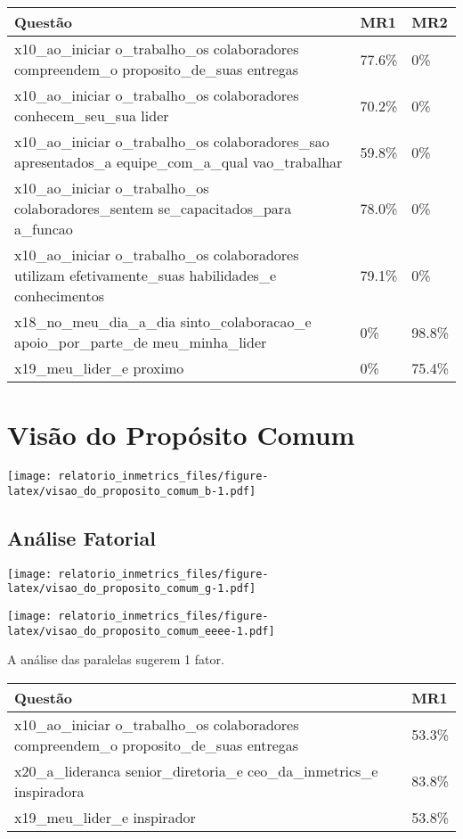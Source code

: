 \documentclass[]{book}
\begin{document}
\begin{table}[H]
\centering\begingroup\fontsize{12}{14}\selectfont

\begin{tabular}{>{\raggedright\arraybackslash}p{20em}ll}
\toprule
Questão & MR1 & MR2\\
\midrule
x10\_ao\_iniciar
o\_trabalho\_os
colaboradores
compreendem\_o
proposito\_de\_suas
entregas & 77.6\% & 0\%\\
x10\_ao\_iniciar
o\_trabalho\_os
colaboradores
conhecem\_seu\_sua
lider & 70.2\% & 0\%\\
x10\_ao\_iniciar
o\_trabalho\_os
colaboradores\_sao
apresentados\_a
equipe\_com\_a\_qual
vao\_trabalhar & 59.8\% & 0\%\\
x10\_ao\_iniciar
o\_trabalho\_os
colaboradores\_sentem
se\_capacitados\_para
a\_funcao & 78.0\% & 0\%\\
x10\_ao\_iniciar
o\_trabalho\_os
colaboradores
utilizam
efetivamente\_suas
habilidades\_e
conhecimentos & 79.1\% & 0\%\\
\addlinespace
x18\_no\_meu\_dia\_a\_dia
sinto\_colaboracao\_e
apoio\_por\_parte\_de
meu\_minha\_lider & 0\% & 98.8\%\\
x19\_meu\_lider\_e
proximo & 0\% & 75.4\%\\
\bottomrule
\end{tabular}
\endgroup{}
\end{table}

\hypertarget{visao-do-proposito-comum}{%
\section{Visão do Propósito Comum}\label{visao-do-proposito-comum}}

\texttt{[image: relatorio\_inmetrics\_files/figure-latex/visao\_do\_proposito\_comum\_b-1.pdf]}

\hypertarget{analise-fatorial-7}{%
\subsection{Análise Fatorial}\label{analise-fatorial-7}}

\texttt{[image: relatorio\_inmetrics\_files/figure-latex/visao\_do\_proposito\_comum\_g-1.pdf]}

\texttt{[image: relatorio\_inmetrics\_files/figure-latex/visao\_do\_proposito\_comum\_eeee-1.pdf]}

A análise das paralelas sugerem 1 fator.

\begin{table}[H]
\centering\begingroup\fontsize{12}{14}\selectfont

\begin{tabular}{>{\raggedright\arraybackslash}p{20em}l}
\toprule
Questão & MR1\\
\midrule
x10\_ao\_iniciar
o\_trabalho\_os
colaboradores
compreendem\_o
proposito\_de\_suas
entregas & 53.3\%\\
x20\_a\_lideranca
senior\_diretoria\_e
ceo\_da\_inmetrics\_e
inspiradora & 83.8\%\\
x19\_meu\_lider\_e
inspirador & 53.8\%\\
\bottomrule
\end{tabular}
\endgroup{}
\end{table}
\end{document}
